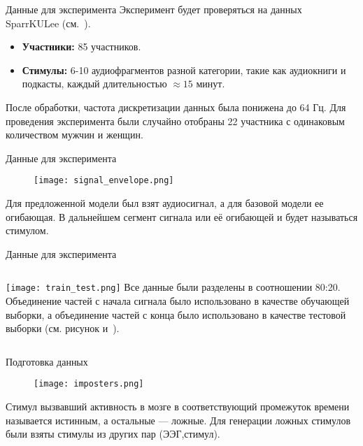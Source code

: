 \documentclass{beamer}
\begin{document}
\begin{frame}{Данные для эксперимента}
Эксперимент будет проверяться на данных SparrKULee (см.~\citep{K3VSND_2023}).
\begin{itemize}
     \item \textbf{Участники:} 85 участников.
    \item \textbf{Стимулы:} 6-10 аудиофрагментов разной категории, такие как аудиокниги и подкасты, каждый длительностью  $\approx15$ минут.
\end{itemize}
\bigskip
После обработки, частота дискретизации  данных была понижена до 64 Гц. Для проведения эксперимента были случайно отобраны 22 участника с одинаковым количеством мужчин и женщин. 
\end{frame}

\begin{frame}{Данные для эксперимента}
\begin{figure}[t]
    \centering
    \texttt{[image: signal\_envelope.png]}
\end{figure}
Для предложенной модели был взят аудиосигнал, а для базовой модели ее огибающая. В дальнейшем сегмент сигнала или её огибающей и будет называться стимулом.
\end{frame}

\begin{frame}{Данные для эксперимента}
\begin{columns}
\texttt{[image: train\_test.png]}
Все данные были разделены в соотношении 80:20. 
Объединение частей с начала сигнала было использовано в качестве обучающей выборки, а объединение частей с конца было использовано в качестве тестовой выборки (см. рисунок и~\citep{Accou2021ModelingTR}).
\end{columns}
\end{frame}

\begin{frame}{Подготовка данных}
\begin{figure}[t]
    \centering
    \texttt{[image: imposters.png]}
\end{figure}
Стимул вызвавший активность в мозге в соответствующий промежуток времени называется истинным, а остальные --- ложные. Для генерации ложных стимулов были взяты стимулы из других пар (ЭЭГ,стимул).
\end{frame}
\end{document}
